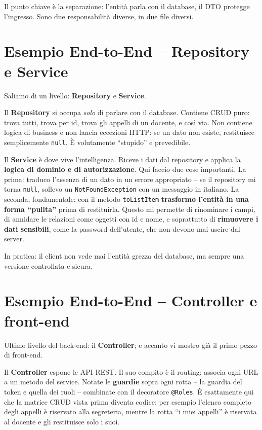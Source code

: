 \documentclass[11pt]{article}
\begin{document}
Il punto chiave è la separazione: l'entità parla con il database, il DTO protegge
l'ingresso. Sono due responsabilità diverse, in due file diversi.

\section*{Esempio End-to-End -- Repository e Service}

Saliamo di un livello: \textbf{Repository} e \textbf{Service}.

Il \textbf{Repository} si occupa \emph{solo} di parlare con il database. Contiene CRUD
puro: trova tutti, trova per id, trova gli appelli di un docente, e così via. Non
contiene logica di business e non lancia eccezioni HTTP: se un dato non esiste,
restituisce semplicemente \texttt{null}. È volutamente ``stupido'' e prevedibile.

Il \textbf{Service} è dove vive l'intelligenza. Riceve i dati dal repository e applica la
\textbf{logica di dominio e di autorizzazione}. Qui faccio due cose importanti. La prima:
traduco l'assenza di un dato in un errore appropriato -- se il repository mi torna
\texttt{null}, sollevo un \texttt{NotFoundException} con un messaggio in italiano. La
seconda, fondamentale: con il metodo \texttt{toListItem} \textbf{trasformo l'entità in
una forma ``pulita''} prima di restituirla. Questo mi permette di rinominare i campi, di
annidare le relazioni come oggetti con id e nome, e soprattutto di \textbf{rimuovere i
dati sensibili}, come la password dell'utente, che non devono mai uscire dal server.

In pratica: il client non vede mai l'entità grezza del database, ma sempre una versione
controllata e sicura.

\section*{Esempio End-to-End -- Controller e front-end}

Ultimo livello del back-end: il \textbf{Controller}; e accanto vi mostro già il primo
pezzo di front-end.

Il \textbf{Controller} espone le API REST. Il suo compito è il routing: associa ogni URL
a un metodo del service. Notate le \textbf{guardie} sopra ogni rotta -- la guardia del
token e quella dei ruoli -- combinate con il decoratore \texttt{@Roles}. È esattamente
qui che la matrice CRUD vista prima diventa codice: per esempio l'elenco completo degli
appelli è riservato alla segreteria, mentre la rotta ``i miei appelli'' è riservata al
docente e gli restituisce solo i suoi.
\end{document}
